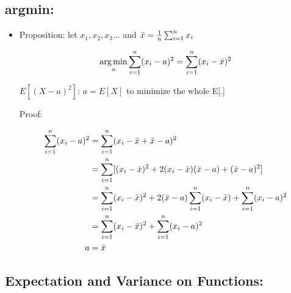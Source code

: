 \documentclass[11pt,letterpaper,titlepage]{article}
\DeclareMathOperator*{\argmin}{arg\,min}
\begin{document}
\subsection{argmin:}

\begin{itemize}

    \item Proposition: let $x_1, x_2, x_3...$ and $\Bar{x} = \frac{1}{n} \sum_{i=1}^{n} x_i$
    
    \begin{equation*}
        \argmin_a \sum_{i=1}^{n} (x_i - a)^2 = \sum_{i=1}^{n} (x_i - \Bar{x})^2
    \end{equation*}
    
    $E[(X-a)^2]$: $a = E[X]$ to minimize the whole E[.]
    
    Proof:
    
    \begin{equation*}
        \begin{aligned}
            \sum_{i=1}^{n} (x_i - a)^2 &= \sum_{i=1}^{n} (x_i - \Bar{x} + \Bar{x} - a)^2 \\
            &= \sum_{i=1}^{n} [(x_i - \Bar{x})^2 + 2(x_i - \Bar{x})(\Bar{x} - a) + (\Bar{x} - a)^2] \\
            &= \sum_{i=1}^{n} (x_i - \Bar{x})^2 + 2(\Bar{x} - a) \sum_{i=1}^{n} (x_i - \Bar{x}) + \sum_{i=1}^{n} (x_i - a)^2 \\
            &= \sum_{i=1}^{n} (x_i - \Bar{x})^2  + \sum_{i=1}^{n} (x_i - a)^2 \\
            a &= \Bar{x}
        \end{aligned}
    \end{equation*}    
    
\end{itemize}

\subsection{Expectation and Variance on Functions:}
\end{document}
